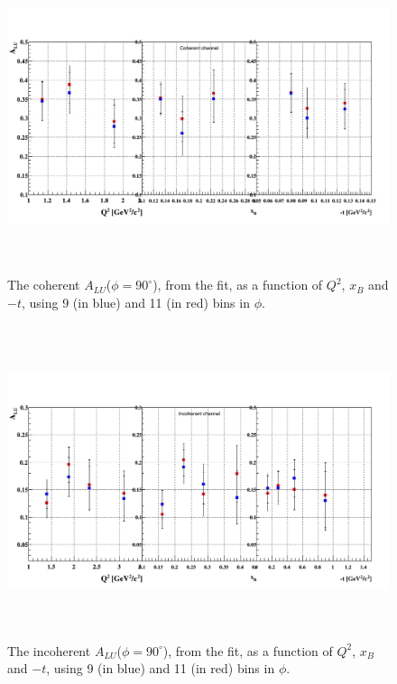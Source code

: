 \begin{figure}[tbp]
   \centering
      \includegraphics[height=9.2cm]{fig_dvcs/BSA_Coherent_9_11.png}
      \caption{The coherent $A_{LU}$($\phi = 90 ^{\circ}$), from the fit, as a 
      function of $Q^{2}$, $x_B$ and $-t$, using 9 (in blue) and 11 (in red) 
   bins in $\phi$.}
      \label{fig:coh_BSA_9_11}
    \end{figure}

\begin{figure}[tbp]
   \centering
      \includegraphics[height=9.2cm]{fig_dvcs/BSA_InCoherent_9_11.png}
      \caption{The incoherent $A_{LU}$($\phi = 90 ^{\circ}$), from the fit, as 
         a function of $Q^{2}$, $x_B$ and $-t$, using 9 (in blue) and 11 (in 
      red) bins in $\phi$. }
      \label{fig:incoh_BSA_9_11}
    \end{figure}

